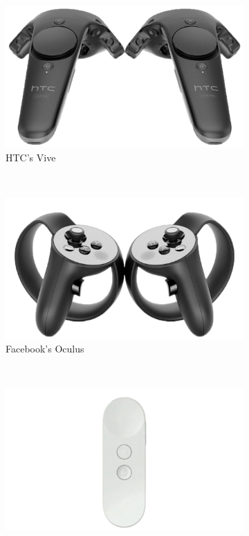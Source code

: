 \documentclass{sigchi}
\begin{document}
\begin{figure}
  \centering
	\begin{subfigure}{.4\columnwidth}
  \includegraphics[width=\textwidth]{figures/controllerVive}
  \caption{HTC's Vive }\label{fig:controllerVive}
  \end{subfigure}
  \\
  \begin{subfigure}{.4\columnwidth}
  \includegraphics[width=\textwidth]{figures/controllerOculus}
  \caption{Facebook's Oculus}\label{fig:controllerOculus}
  \end{subfigure}
  \\
  \begin{subfigure}{.4\columnwidth}
  \includegraphics[width=\textwidth]{figures/controllerDaydream}

\end{subfigure}
\end{figure}
\end{document}
